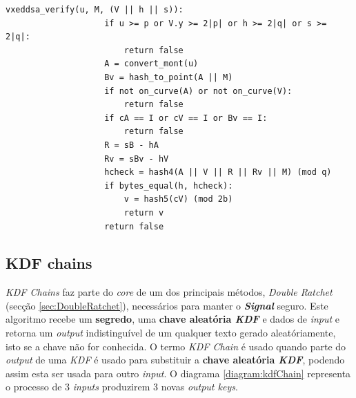 \begin{itemize}
\begin{itemize}
\begin{itemize}
            \begin{lstlisting}[caption=Validação de assinatura de um documento,captionpos=b, label={vxeddsa_verify}]
                vxeddsa_verify(u, M, (V || h || s)):
                    if u >= p or V.y >= 2|p| or h >= 2|q| or s >= 2|q|:
                        return false
                    A = convert_mont(u)
                    Bv = hash_to_point(A || M)
                    if not on_curve(A) or not on_curve(V):
                        return false
                    if cA == I or cV == I or Bv == I:
                        return false
                    R = sB - hA
                    Rv = sBv - hV
                    hcheck = hash4(A || V || R || Rv || M) (mod q)
                    if bytes_equal(h, hcheck):
                        v = hash5(cV) (mod 2b)
                        return v
                    return false
            \end{lstlisting}
        \end{itemize}
    \end{itemize}
\end{itemize}

\subsection{KDF chains}\label{sec:KDF}
\textit{KDF Chains} faz parte do \emph{core} de um dos principais métodos, \emph{Double Ratchet} (secção \ref{sec:DoubleRatchet}), necessários para manter o \textbf{\textit{Signal}} seguro.
Este algoritmo recebe um \textbf{segredo}, uma \textbf{chave aleatória \textit{KDF}} e dados de \emph{input} e retorna um \emph{output} indistinguível de um qualquer texto gerado aleatóriamente, isto se a chave não for conhecida.
O termo \emph{KDF Chain} é usado quando parte do \emph{output} de uma \emph{KDF} é usado para substituir a \textbf{chave aleatória \textit{KDF}}, podendo assim esta ser usada para outro \emph{input}. O diagrama \ref{diagram:kdfChain} representa o processo de 3 \emph{inputs} produzirem 3 novas \emph{output keys}.


